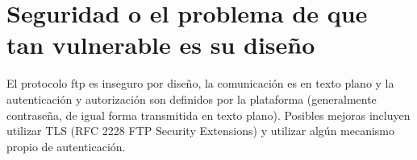 \documentclass{llncs}
\begin{document}
\section*{Seguridad o el problema de que tan vulnerable es su diseño}

El protocolo ftp es inseguro por diseño, la comunicación es en texto plano y la autenticación y autorización son definidos
por la plataforma (generalmente contraseña, de igual forma transmitida en texto plano). Posibles mejoras incluyen
utilizar TLS (RFC 2228 FTP Security Extensions) y utilizar algún mecanismo propio de autenticación.
\end{document}
